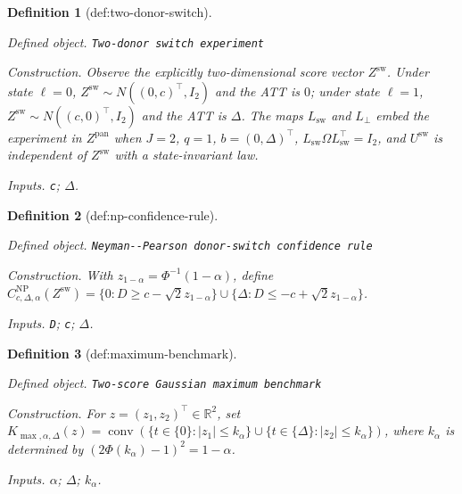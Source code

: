 \documentclass{article}
\newtheorem{definition}{Definition}
\begin{document}
\begin{definition}[def:two-donor-switch]\label{def:two-donor-switch}
\par\smallskip\noindent\emph{Defined object.} \texttt{Two-\allowbreak{}donor switch experiment}
\par\smallskip\noindent\emph{Construction.} Observe the explicitly two-dimensional score vector \(Z^{\mathrm{sw}}\). Under state \(\ell=0\), \(Z^{\mathrm{sw}}\sim N((0,c)^{\top},I_2)\) and the ATT is \(0\); under state \(\ell=1\), \(Z^{\mathrm{sw}}\sim N((c,0)^{\top},I_2)\) and the ATT is \(\Delta\). The maps \(L_{\mathrm{sw}}\) and \(L_{\perp}\) embed the experiment in \(Z^{\mathrm{pan}}\) when \(J=2\), \(q=1\), \(b=(0,\Delta)^{\top}\), \(L_{\mathrm{sw}}\Omega L_{\mathrm{sw}}^{\top}=I_2\), and \(U^{\mathrm{sw}}\) is independent of \(Z^{\mathrm{sw}}\) with a state-invariant law.
\par\smallskip\noindent\emph{Inputs.} \texttt{c}; \(\Delta\).
\end{definition}

\begin{definition}[def:np-confidence-rule]\label{def:np-confidence-rule}
\par\smallskip\noindent\emph{Defined object.} \texttt{Neyman-\allowbreak{}-\allowbreak{}Pearson donor-\allowbreak{}switch confidence rule}
\par\smallskip\noindent\emph{Construction.} With \(z_{1-\alpha}=\Phi^{-1}(1-\alpha)\), define \(C^{\mathrm{NP}}_{c,\Delta,\alpha}(Z^{\mathrm{sw}})=\{0:D\ge c-\sqrt2z_{1-\alpha}\}\cup\{\Delta:D\le-c+\sqrt2z_{1-\alpha}\}\).
\par\smallskip\noindent\emph{Inputs.} \texttt{D}; \texttt{c}; \(\Delta\).
\end{definition}

\begin{definition}[def:maximum-benchmark]\label{def:maximum-benchmark}
\par\smallskip\noindent\emph{Defined object.} \texttt{Two-\allowbreak{}score Gaussian maximum benchmark}
\par\smallskip\noindent\emph{Construction.} For \(z=(z_1,z_2)^{\top}\in\mathbb R^2\), set \(K_{\max,\alpha,\Delta}(z)=\operatorname{conv}(\{t\in\{0\}:|z_1|\le k_{\alpha}\}\cup\{t\in\{\Delta\}:|z_2|\le k_{\alpha}\})\), where \(k_{\alpha}\) is determined by \((2\Phi(k_{\alpha})-1)^2=1-\alpha\).
\par\smallskip\noindent\emph{Inputs.} \(\alpha\); \(\Delta\); \(k_{\alpha}\).
\end{definition}
\end{document}
